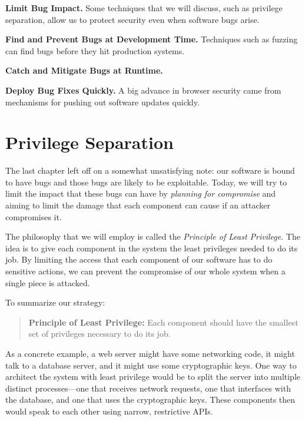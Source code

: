 \documentclass[
  letterpaper,
]{scrbook}
\theoremstyle{definition}
\theoremstyle{plain}
\theoremstyle{plain}
\theoremstyle{remark}
\begin{document}
\textbf{Limit Bug Impact.} Some techniques that we will discuss, such as
privilege separation, allow us to protect security even when software
bugs arise.

\textbf{Find and Prevent Bugs at Development Time.} Techniques such as
fuzzing can find bugs before they hit production systems.

\textbf{Catch and Mitigate Bugs at Runtime.}

\textbf{Deploy Bug Fixes Quickly.} A big advance in browser security
came from mechanisms for pushing out software updates quickly.

\chapter{Privilege Separation}\label{privilege-separation}

The last chapter left off on a somewhat unsatisfying note: our software
is bound to have bugs and those bugs are likely to be exploitable.
Today, we will try to limit the impact that these bugs can have by
\emph{planning for compromise} and aiming to limit the damage that each
component can cause if an attacker compromises it.

The philosophy that we will employ is called the \emph{Principle of
Least Privilege}. The idea is to give each component in the system the
least privileges needed to do its job. By limiting the access that each
component of our software has to do sensitive actions, we can prevent
the compromise of our whole system when a single piece is attacked.


To summarize our strategy:

\begin{quote}
\textbf{Principle of Least Privilege:} Each component should have the
smallest set of privileges necessary to do its job.
\end{quote}

As a concrete example, a web server might have some networking code, it
might talk to a database server, and it might use some cryptographic
keys. One way to architect the system with least privilege would be to
split the server into multiple distinct processes---one that receives
network requests, one that interfaces with the database, and one that
uses the cryptographic keys. These components then would speak to each
other using narrow, restrictive APIs.
\end{document}
